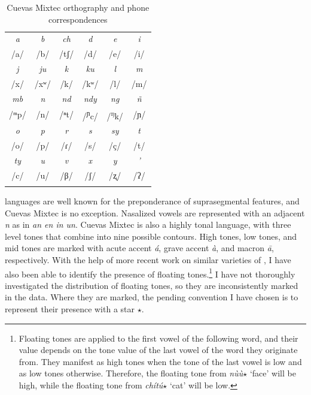 \documentclass[output=paper,modfonts,nonflat]{langsci/langscibook}
\begin{document}
\begin{table}[ht]
\caption{Cuevas Mixtec orthography and phone correspondences}
\label{tab:cisneros:1}
\begin{tabularx}{.5\textwidth}{CCCCCC} 
\lsptoprule
\textit{a} & \textit{b} & \textit{ch} & \textit{d} & \textit{e} & \textit{i}\\ 
/a/ & /b/ & /tʃ/ & /d/ & /e/ & /i/ \\
\midrule
\textit{j} & \textit{ju} & \textit{k} & \textit{ku} & \textit{l} & \textit{m}\\
/x/ & /xʷ/ & /k/ & /kʷ/ & /l/ & /m/\\
\midrule
 \textit{mb} & \textit{n} & \textit{nd} & \textit{ndy} & \textit{ng} & \textit{ñ}\\ 
/ᵐp/ & /n/ & /ⁿt/ & /\textsuperscript{ɲ}c/ & /\textsuperscript{ŋ}k/ & /ɲ/\\
\midrule
\textit{o} & \textit{p} & \textit{r} & \textit{s} & \textit{sy} & \textit{t}\\
/o/ & /p/ & /ɾ/ & /s/ & /ç/ & /t/\\
\midrule
\textit{ty} & \textit{u} & \textit{v} & \textit{x} & \textit{y} & \textit{'}\\
/c/ & /u/ & /β/ & /ʃ/ & /ʐ/ & /ʔ/\\
\lspbottomrule
\end{tabularx}
\end{table}

 languages are well known for the preponderance of suprasegmental features, and Cuevas Mixtec is no exception.  Nasalized vowels are represented with an adjacent \textit{n} as in \textit{an en in un}.   Cuevas Mixtec is also a highly tonal language, with three level tones that combine into nine possible contours.  High tones, low tones, and mid tones are marked with acute accent \textit{\'a}, grave accent \textit{\`a}, and macron \textit{\=a}, respectively.  With the help of more recent work on similar varieties of  \citep{Carroll2015}, I have also been able to identify the presence of floating tones.\footnote{ Floating tones are applied to the first vowel of the following word, and their value depends on the tone value of the last vowel of the word they originate from.  They manifest as high tones when the tone of the last vowel is low and as low tones otherwise.  Therefore, the floating tone from \textit{n\`u\`u$\star$} `face' will be high, while the floating tone from \textit{ch\'it\'u$\star$} `cat' will be low.}  I have not thoroughly investigated the distribution of floating tones, so they are inconsistently marked in the data.  Where they are marked, the pending convention I have chosen is to represent their presence with a star $\star$. 
\end{document}
